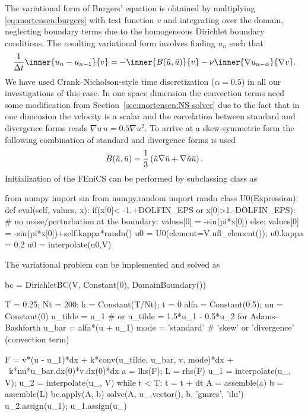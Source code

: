 The variational form of Burgers' equation is obtained by multiplying
\eqref{eq:mortensen:burgers} with test function $v$ and integrating over
the domain, neglecting boundary terms due to the homogeneous Dirichlet boundary
conditions. The resulting variational form involves finding $u_n$ such that
\begin{equation}
 \frac{1}{\Delta t}\inner{ u_{n} - u_{n-1}}{v}
      = - \inner{B(\tilde{u},\Bar{u})}{ v }
          - \nu \inner{ \nabla u_{n-\alpha}}{\nabla v }.
\label{eq:mortensen:burgers_vf}
\end{equation}
We have used Crank--Nicholson-style time discretization ($\alpha=0.5$)
in all our investigations of this case. In one space
dimension the convection terms need some modification from
Section~\ref{sec:mortensen:NS-solver} due to the fact that in one dimension the
velocity is a scalar and the correlation between standard and divergence
forms reads $\nabla u \, u =0.5 \nabla u^2$. To arrive at a skew-symmetric
form the following combination of standard and divergence forms is used
\begin{equation}
 B(\tilde{u},\Bar{u})
    = \frac{1}{3}\left( \tilde{u}\nabla \Bar{u}
      + \nabla \tilde{u} \Bar{u} \right).
\end{equation}
Initialization of the FEniCS  can be performed by
subclassing class  as
\begin{python}
from numpy import sin
from numpy.random import randn
class U0(Expression):
    def eval(self, values, x):
        if(x[0]< -1.+DOLFIN_EPS or x[0]>1.-DOLFIN_EPS):
            # no noise/perturbation at the boundary:
            values[0] = -sin(pi*x[0])
        else:
            values[0] = -sin(pi*x[0])+self.kappa*randn()
u0 = U0(element=V.ufl_element()); u0.kappa = 0.2
u0 = interpolate(u0,V)
\end{python}
The variational problem can be implemented and solved as
\begin{python}
bc = DirichletBC(V, Constant(0), DomainBoundary())

T = 0.25; Nt = 200; k = Constant(T/Nt); t = 0
alfa = Constant(0.5); nu = Constant(0)
u_tilde = u_1 # or u_tilde = 1.5*u_1 - 0.5*u_2 for Adams-Bashforth
u_bar = alfa*(u + u_1)
mode = 'standard'  # 'skew' or 'divergence' (convection term)

F = v*(u - u_1)*dx + k*conv(u_tilde, u_bar, v, mode)*dx + \
    k*nu*u_bar.dx(0)*v.dx(0)*dx
a = lhs(F); L = rhs(F)
u_1 = interpolate(u_, V); u_2 = interpolate(u_, V)
while t < T:
    t = t + dt
    A = assemble(a)
    b = assemble(L)
    bc.apply(A, b)
    solve(A, u_.vector(), b, 'gmres', 'ilu')
    u_2.assign(u_1); u_1.assign(u_)
\end{python}

